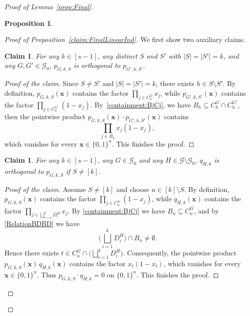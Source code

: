 \documentclass[11pt]{article}
\newtheorem{prop}[theorem]{Proposition}
\newtheorem{claim}[theorem]{Claim}
\theoremstyle{definition}
\newenvironment{poc}{\begin{proof}[Proof of the claim]\renewcommand*{\qedsymbol}{$\blacksquare$}}{\end{proof}}
\begin{document}
\begin{proof}[Proof of Lemma~\ref{prop:Final}]
\begin{prop}
\end{prop}
\begin{proof}[Proof of Proposition~\ref{claim:FinalLinearInd}]
We first show two auxiliary claims.
\begin{claim}\label{claim:PPPP}
   For any \(k\in [s-1]\), any distinct \(S\) and \(S'\) with \(|S|=|S'|=k\), and any \(G,G'\in\mathcal{G}_{0}\), \(p_{G,k,S}\) is orthogonal to \(p_{G',k,S'}\).
\end{claim}
\begin{poc}
    {Since \(S\neq S'\) and \(|S|=|S'|=k\), there exists \(h\in S\setminus S'\).
By definition, \(p_{G,k,S}(\bm{x})\) contains the factor \(\prod_{j\in C_h^{G}} x_j\), while \(p_{G',k,S'}(\bm{x})\) contains the factor \(\prod_{j\in C_h^{G'}} (1-x_j)\).
By~\eqref{containment:BjCj}, we have \(B_h\subseteq C_h^{G}\cap C_h^{G'}\), then the pointwise product \(p_{G,k,S}(\bm{x})\cdot p_{G',k,S'}(\bm{x})\) contains
\[
\prod_{j\in B_h} x_j(1-x_j),
\]
which vanishes for every \(\bm{x}\in\{0,1\}^n\).
This finishes the proof.}
\end{poc}
\begin{claim}\label{Claim:PQPQ}
    For any \(k\in [s-1]\), any \(G\in\mathcal{G}_{0}\) and any $H\in \mathcal{G}\setminus \mathcal{G}_{0}$, 
     $q_{H,k}$ is orthogonal to $p_{G,k,S}$ if $S\neq [k]$.
\end{claim}
\begin{poc}
    { Assume \(S\neq [k]\) and choose \(u\in [k]\setminus S\).
By definition, \(p_{G,k,S}(\bm{x})\) contains the factor \(\prod_{j\in C_u^{G}} (1-x_j)\),
while \(q_{H,k}(\bm{x})\) contains the factor \(\prod_{j\in \bigsqcup_{i=1}^{k} D_i^{H}} x_j\).
By \eqref{containment:BjCj} we have \(B_u\subseteq C_u^{G}\), and by \eqref{RelationBDBD} we have
\[
\bigg(\bigsqcup_{i=1}^{k} D_i^{H}\bigg)\cap B_u \neq \emptyset .
\]
Hence there exists \(t\in C_u^{G}\cap \big(\bigsqcup_{i=1}^{k} D_i^{H}\big)\).
Consequently, the pointwise product \(p_{G,k,S}(\bm{x})\, q_{H,k}(\bm{x})\) contains the factor
\(x_t(1-x_t)\), which vanishes for every \(\bm{x}\in\{0,1\}^n\).
Thus \(p_{G,k,S}\cdot q_{H,k}= 0\) on \(\{0,1\}^n\). This finishes the proof.}
\end{poc}


\end{proof}
\end{proof}
\end{document}
